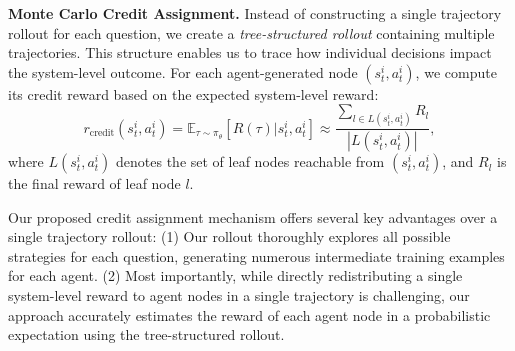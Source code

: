 \textbf{Monte Carlo Credit Assignment.} Instead of constructing a single trajectory rollout for each question, we create a \textit{tree-structured rollout} containing multiple trajectories. 
This structure enables us to trace how individual decisions impact the system-level outcome. 
For each agent-generated node $(s^i_t, a^i_t)$, we compute its credit reward based on the expected system-level reward:
%
\begin{equation}\label{eq:mc_est}
     r_{\text{credit}}(s^i_t, a^i_t) = \mathbb{E}_{\tau \sim \pi_\theta}[R(\tau) | s^i_t,a^i_t]  \approx \frac{\sum_{l \in L(s^i_t, a^i_t)} R_l}{|L(s^i_t, a^i_t)|},
\end{equation}
%
where $L(s^i_t, a^i_t)$ denotes the set of leaf nodes reachable from $(s^i_t, a^i_t)$, and $R_l$ is the final reward of leaf node $l$.

Our proposed credit assignment mechanism offers several key advantages over a single trajectory rollout:
(1) Our rollout thoroughly explores all possible strategies for each question, generating numerous intermediate training examples for each agent. 
(2) Most importantly, while directly redistributing a single system-level reward to agent nodes in a single trajectory is challenging, our approach accurately estimates the reward of each agent node in a probabilistic expectation using the tree-structured rollout.



